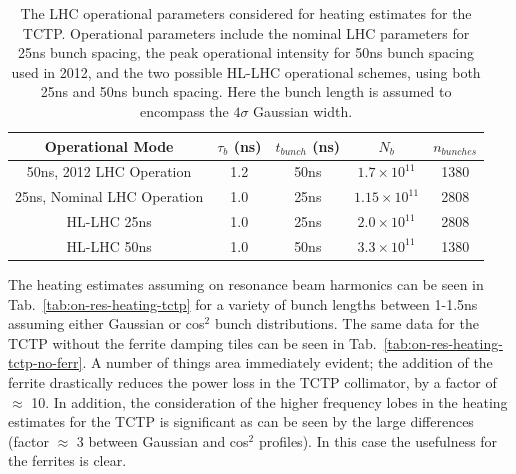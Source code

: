 \begin{table}
\caption{The LHC operational parameters considered for heating estimates for the TCTP. Operational parameters include the nominal LHC parameters for 25ns bunch spacing, the peak operational intensity for 50ns bunch spacing used in 2012, and the two possible HL-LHC operational schemes, using both 25ns and 50ns bunch spacing. Here the bunch length is assumed to encompass the $4\sigma$ Gaussian width.}
\label{tab:lhc-tctp-heating-para}
\begin{center}
\begin{tabular}{c | c | c | c | c }
Operational Mode & $\tau_{b}$ (ns) & $t_{bunch}$ (ns) & $N_{b}$ & $n_{bunches}$ \\ \hline
50ns, 2012 LHC Operation & 1.2 & 50ns & $1.7 \times 10^{11}$ & 1380 \\ \hline
25ns, Nominal LHC Operation & 1.0 & 25ns & $1.15 \times 10^{11}$ & 2808 \\ \hline
HL-LHC 25ns & 1.0 & 25ns & $2.0 \times 10^{11}$ & 2808 \\ \hline
HL-LHC 50ns & 1.0 & 50ns & $3.3 \times 10^{11}$ & 1380 \\ \hline
\end{tabular}
\end{center}
\end{table}

The heating estimates assuming on resonance beam harmonics can be seen in Tab.~\ref{tab:on-res-heating-tctp} for a variety of bunch lengths between 1-1.5ns assuming either Gaussian or cos$^{2}$ bunch distributions. The same data for the TCTP without the ferrite damping tiles can be seen in Tab.~\ref{tab:on-res-heating-tctp-no-ferr}. A number of things area immediately evident; the addition of the ferrite drastically reduces the power loss in the TCTP collimator, by a factor of $\approx$ 10. In addition, the consideration of the higher frequency lobes in the heating estimates for the TCTP is significant as can be seen by the large differences (factor $\approx$ 3 between Gaussian and cos$^{2}$ profiles). In this case the usefulness for the ferrites is clear.

